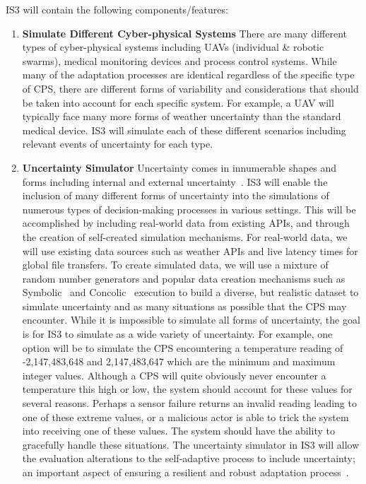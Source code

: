 \documentclass[11pt]{proposalnsf}
\newlength\q %
\begin{document}
\begin{sloppypar}
IS3 will contain the following components/features:

\begin{enumerate}[noitemsep]
	\item \textbf{Simulate Different Cyber-physical Systems} There are many different types of cyber-physical systems including UAVs (individual \& robotic swarms), medical monitoring devices and process control systems. While many of the adaptation processes are identical regardless of the specific type of CPS, there are different forms of variability and considerations that should be taken into account for each specific system. For example, a UAV will typically face many more forms of weather uncertainty than the standard medical device. IS3 will simulate each of these different scenarios including relevant events of uncertainty for each type. 
    
    
    \item \textbf{Uncertainty Simulator} Uncertainty comes in innumerable shapes and forms including internal and external uncertainty~\cite{esfahani2013uncertainty}. IS3 will enable the inclusion of many different forms of uncertainty into the simulations of numerous types of decision-making processes in various settings. This will be accomplished by including real-world data from existing APIs, and through the creation of self-created simulation mechanisms. For real-world data, we will use existing data sources such as weather APIs and live latency times for global file transfers. To create simulated data, we will use a mixture of random number generators and popular data creation mechanisms such as Symbolic~\cite{king1976symbolic} and Concolic~\cite{sen2005cute} execution to build a diverse, but realistic dataset to simulate uncertainty and as many situations as possible that the CPS may encounter. While it is impossible to simulate all forms of uncertainty, the goal is for IS3 to simulate as a wide variety of uncertainty. For example, one option will be to simulate the CPS encountering a temperature reading of -2,147,483,648 and 2,147,483,647 which are the minimum and maximum integer values. Although a CPS will quite obviously never encounter a temperature this high or low, the system should account for these values for several reasons. Perhaps a sensor failure returns an invalid reading leading to one of these extreme values, or a malicious actor is able to trick the system into receiving one of these values. The system should have the ability to gracefully handle these situations. The uncertainty simulator in IS3 will allow the evaluation alterations to the self-adaptive process to include uncertainty; an important aspect of ensuring a resilient and robust adaptation process~\cite{moreno2016efficient, Moreno:2015:PSU:2786805.2786853, camara2017uncertainty, han2016handling}. 
 

\end{enumerate}
\end{sloppypar}
\end{document}
